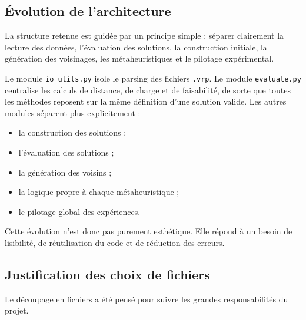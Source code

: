 \documentclass[11pt,a4paper]{article}
\begin{document}
\subsection{Évolution de l'architecture}
La structure retenue est guidée par un principe simple : séparer clairement la lecture des données, l'évaluation des solutions, la construction initiale, la génération des voisinages, les métaheuristiques et le pilotage expérimental.

Le module \texttt{io\_utils.py} isole le parsing des fichiers \texttt{.vrp}. Le module \texttt{evaluate.py} centralise les calculs de distance, de charge et de faisabilité, de sorte que toutes les méthodes reposent sur la même définition d'une solution valide. Les autres modules séparent plus explicitement :
\begin{itemize}
    \item la construction des solutions ;
    \item l'évaluation des solutions ;
    \item la génération des voisins ;
    \item la logique propre à chaque métaheuristique ;
    \item le pilotage global des expériences.
\end{itemize}

Cette évolution n'est donc pas purement esthétique. Elle répond à un besoin de lisibilité, de réutilisation du code et de réduction des erreurs.

\subsection{Justification des choix de fichiers}
Le découpage en fichiers a été pensé pour suivre les grandes responsabilités du projet.
\end{document}
